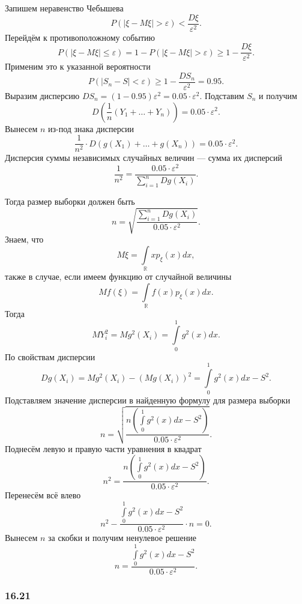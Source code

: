 Запишем неравенство Чебышева
$$P \left( \left| \xi - M \xi \right| > \varepsilon \right) <
  \frac{D \xi }{ \varepsilon^2}.$$
Перейдём к противоположному событию
$$P \left( \left| \xi - M \xi \right| \leq \varepsilon \right) =
  1 - P \left( \left| \xi - M \xi \right| > \varepsilon \right) \geq
  1 - \frac{D \xi }{ \varepsilon^2}.$$
Применим это к указанной вероятности
$$P \left( \left| S_n - S \right| < \varepsilon \right) \geq
  1 - \frac{DS_n}{ \varepsilon^2} =
  0.95.$$
Выразим дисперсию $DS_n = \left( 1 - 0.95 \right) \varepsilon^2 = 0.05 \cdot \varepsilon^2$.
Подставим $S_n$ и получим
$$ D \left( \frac{1}{n} \left( Y_1 + \dotsc + Y_n \right) \right) =
  0.05 \cdot \varepsilon^2.$$
Вынесем $n$ из-под знака дисперсии
$$ \frac{1}{n^2} \cdot D \left( g \left( X_1 \right) + \dotsc + g \left( X_n \right) \right) =
  0.05 \cdot \varepsilon^2.$$
Дисперсия суммы независимых случайных величин --- сумма их дисперсий
$$ \frac{1}{n^2 } =
  \frac{0.05 \cdot \varepsilon^2}{ \sum \limits_{i = 1}^n Dg \left( X_i \right) }.$$

Тогда размер выборки должен быть
$$n =
  \sqrt{ \frac{ \sum \limits_{i = 1}^n Dg \left( X_i \right) }{0.05 \cdot \varepsilon^2}}.$$
Знаем, что
$$M \xi =
  \int \limits_{ \mathbb{R}} x p_{ \xi } \left( x \right) dx,$$
также в случае, если имеем функцию от случайной величины
$$Mf \left( \xi \right) =
  \int \limits_{ \mathbb{R}} f \left( x \right) p_{ \xi } \left( x \right) dx.$$
Тогда
$$MY_i^2 =
  Mg^2 \left( X_i \right) =
  \int \limits_0^1 g^2 \left( x \right) dx.$$
По свойствам дисперсии
$$Dg \left( X_i \right) =
  Mg^2 \left( X_i \right) - \left( Mg \left( X_i \right) \right)^2 =
  \int \limits_0^1 g^2 \left( x \right) dx - S^2.$$
Подставляем значение дисперсии в найденную формулу для размера выборки
$$n =
  \sqrt{
    \frac{n \left( \int \limits_0^1 g^2 \left( x \right) dx - S^2 \right) }{0.05 \cdot \varepsilon^2}
  }.$$
Поднесём левую и правую части уравнения в квадрат
$$n^2 =
  \frac{n \left(
      \int \limits_0^1 g^2 \left( x \right) dx - S^2
    \right) }{0.05 \cdot \varepsilon^2}.$$
Перенесём всё влево
$$n^2 - \frac{\int \limits_0^1 g^2 \left( x \right) dx - S^2}{0.05 \cdot \varepsilon^2} \cdot n =
  0.$$
Вынесем $n$ за скобки и получим ненулевое решение
$$n =
  \frac{\int \limits_0^1 g^2 \left( x \right) dx - S^2}{0.05 \cdot \varepsilon^2}.$$

\subsubsection*{16.21}

